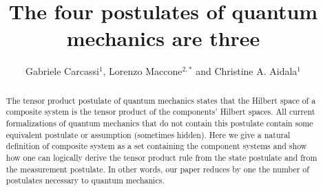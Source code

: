 \documentclass[aps,prl,amsmath,amssymb,twocolumn,nofootinbib]{revtex4}
\theoremstyle{plain}
\theoremstyle{definition}
\theoremstyle{remark}
\begin{document}
\title{The four postulates of quantum mechanics are three}
\author{Gabriele Carcassi$^1$, Lorenzo Maccone$^{2,*}$ and Christine A. Aidala$^1$
}
\begin{abstract}
  The tensor product postulate of quantum mechanics states that the
  Hilbert space of a composite system is the tensor product of the
  components' Hilbert spaces. All current formalizations of quantum
  mechanics that do not contain this postulate contain some equivalent
  postulate or assumption (sometimes hidden). Here we give a natural
  definition of composite system as a set containing the component
  systems and show how one can logically derive the tensor product
  rule from the state postulate and from the measurement postulate. In
  other words, our paper reduces by one the number of postulates
  necessary to quantum mechanics.
\end{abstract}
\pacs{}
\maketitle
\end{document}
